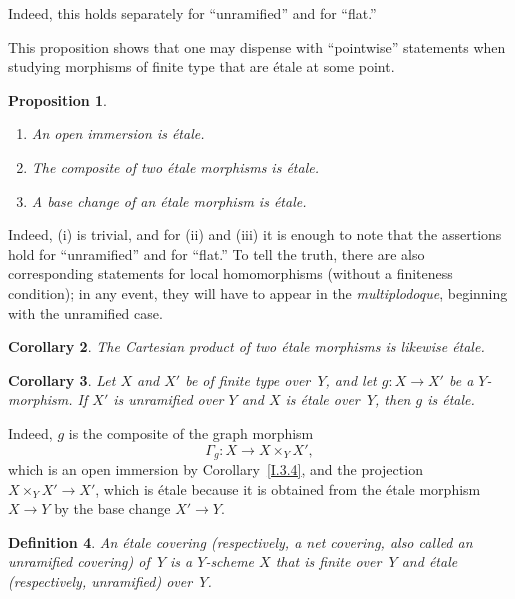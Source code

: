 \documentclass[11pt,oneside]{amsbook}
\newtheorem{proposition}{Proposition}[section]
\newtheorem{corollary}[proposition]{Corollary}
\newtheorem{definition}[proposition]{Definition}
\begin{document}
Indeed, this holds separately for ``unramified'' and for ``flat.''

This proposition shows that one may dispense with ``pointwise'' statements
when studying morphisms of finite type that are étale at some point.

\begin{proposition}
\label{I.4.6}
\begin{enumerate}
\item[(i)] An open immersion is étale.
\item[(ii)] The composite of two étale morphisms is étale.
\item[(iii)] A base change of an étale morphism is étale.
\end{enumerate}
\end{proposition}

%
Indeed, \textup{(i)} is trivial, and for \textup{(ii)} and \textup{(iii)}
it is enough to note that the assertions hold for ``unramified'' and for
``flat.''  To tell the truth, there are also corresponding statements for
local homomorphisms (without a finiteness condition); in any event, they will
have to appear in the \emph{multiplodoque}, beginning with the unramified
case.

\begin{corollary}
\label{I.4.7}
The Cartesian product of two étale morphisms is likewise étale.
\end{corollary}

\begin{corollary}
\label{I.4.8}
Let \(X\) and \(X'\) be of finite type over~\(Y\), and let
\(g\colon X\to X'\) be a \(Y\)-morphism.  If \(X'\) is unramified over
\(Y\) and \(X\) is étale over~\(Y\), then \(g\) is étale.
\end{corollary}

Indeed, \(g\) is the composite of the graph morphism
\[
  \Gamma_g\colon X\longrightarrow X\times_Y X',
\]
which is an open immersion by Corollary~\ref{I.3.4}, and the projection
\(X\times_Y X'\to X'\), which is étale because it is obtained from the
étale morphism \(X\to Y\) by the base change \(X'\to Y\).

\begin{definition}
\label{I.4.9}
An \emph{étale covering} (respectively, a \emph{net covering}, also called
an unramified covering) of~\(Y\) is a \(Y\)-scheme \(X\) that is finite
over~\(Y\) and étale (respectively, unramified) over~\(Y\).
\end{definition}
\end{document}
